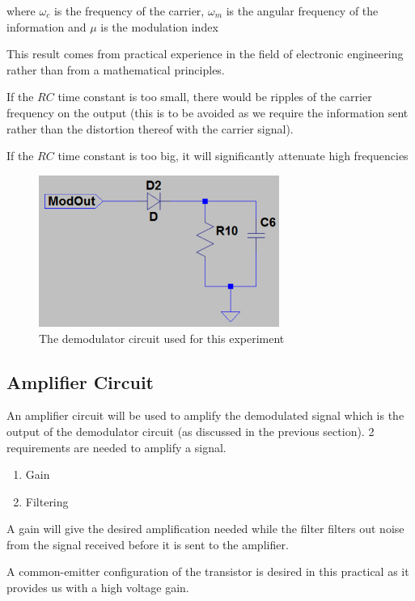 \documentclass[12pt, a4paper]{article}
\begin{document}
		where $\omega_c$ is the frequency of the carrier, $\omega_m$ is the angular frequency of the information and $\mu$ is the modulation index

		This result comes from practical experience in the field of electronic engineering rather than from a mathematical principles.

		If the $RC$ time constant is too small, there would be ripples of the carrier frequency on the output (this is to be avoided as we require the information sent rather than the distortion thereof with the carrier signal).

		If the $RC$ time constant is too big, it will significantly attenuate high frequencies 


		\begin{figure}[H]
			\centering
			\includegraphics[width=0.7\textwidth]{images/Demodulator_circuit.png}
			\caption{The demodulator circuit used for this experiment}
			\label{fig:demodulator_circuit}
		\end{figure}

	\subsection{Amplifier Circuit} %
	\label{sub:amplifier_circuit}
	 An amplifier circuit will be used to amplify the demodulated signal which is the output of the demodulator circuit (as discussed in the previous section). 2 requirements are needed to amplify a signal.
	 \begin{enumerate}
	 	\item Gain
	 	\item Filtering
	 \end{enumerate}

	 A gain will give the desired amplification needed while the filter filters out noise from the signal received before it is sent to the amplifier.

	 A common-emitter configuration of the transistor is desired in this practical as it provides us with a high voltage gain. 
\end{document}
